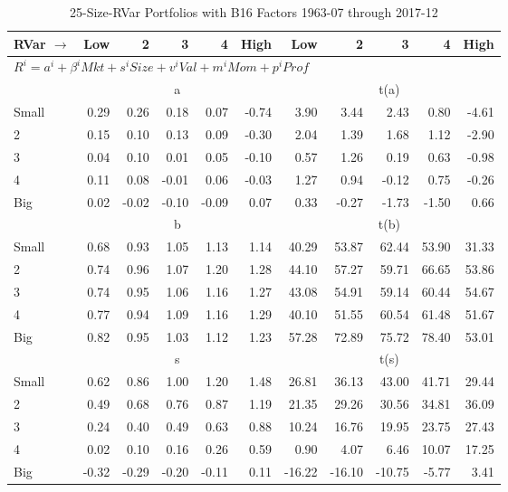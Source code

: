 
\begin{table}[!ht]
\footnotesize
\centering
\caption{25-Size-RVar Portfolios with B16 Factors 1963-07 through 2017-12}
\begin{tabular}{lrrrrrrrrrr}
  \toprule
    
    RVar $\rightarrow$ & Low & 2 & 3 & 4 & High & Low & 2 & 3 & 4 & High  \\ 
  \midrule
  \multicolumn{11}{l}{$R^i=a^i+\beta^iMkt+s^iSize+v^iVal+m^iMom+p^iProf$}  \\
  
     & \multicolumn{5}{c}{a} & \multicolumn{5}{c}{t(a)}   \\
     \cmidrule(r){2-6} \cmidrule(r){7-11} 
    Small  & 0.29  & 0.26  & 0.18  & 0.07  & -0.74  & 3.90  & 3.44  & 2.43  & 0.80  & -4.61   \\
    2  & 0.15  & 0.10  & 0.13  & 0.09  & -0.30  & 2.04  & 1.39  & 1.68  & 1.12  & -2.90   \\
    3  & 0.04  & 0.10  & 0.01  & 0.05  & -0.10  & 0.57  & 1.26  & 0.19  & 0.63  & -0.98   \\
    4  & 0.11  & 0.08  & -0.01  & 0.06  & -0.03  & 1.27  & 0.94  & -0.12  & 0.75  & -0.26   \\
    Big  & 0.02  & -0.02  & -0.10  & -0.09  & 0.07  & 0.33  & -0.27  & -1.73  & -1.50  & 0.66   \\
    
  
     & \multicolumn{5}{c}{b} & \multicolumn{5}{c}{t(b)}   \\
     \cmidrule(r){2-6} \cmidrule(r){7-11} 
    Small  & 0.68  & 0.93  & 1.05  & 1.13  & 1.14  & 40.29  & 53.87  & 62.44  & 53.90  & 31.33   \\
    2  & 0.74  & 0.96  & 1.07  & 1.20  & 1.28  & 44.10  & 57.27  & 59.71  & 66.65  & 53.86   \\
    3  & 0.74  & 0.95  & 1.06  & 1.16  & 1.27  & 43.08  & 54.91  & 59.14  & 60.44  & 54.67   \\
    4  & 0.77  & 0.94  & 1.09  & 1.16  & 1.29  & 40.10  & 51.55  & 60.54  & 61.48  & 51.67   \\
    Big  & 0.82  & 0.95  & 1.03  & 1.12  & 1.23  & 57.28  & 72.89  & 75.72  & 78.40  & 53.01   \\
    
  
     & \multicolumn{5}{c}{s} & \multicolumn{5}{c}{t(s)}   \\
     \cmidrule(r){2-6} \cmidrule(r){7-11} 
    Small  & 0.62  & 0.86  & 1.00  & 1.20  & 1.48  & 26.81  & 36.13  & 43.00  & 41.71  & 29.44   \\
    2  & 0.49  & 0.68  & 0.76  & 0.87  & 1.19  & 21.35  & 29.26  & 30.56  & 34.81  & 36.09   \\
    3  & 0.24  & 0.40  & 0.49  & 0.63  & 0.88  & 10.24  & 16.76  & 19.95  & 23.75  & 27.43   \\
    4  & 0.02  & 0.10  & 0.16  & 0.26  & 0.59  & 0.90  & 4.07  & 6.46  & 10.07  & 17.25   \\
    Big  & -0.32  & -0.29  & -0.20  & -0.11  & 0.11  & -16.22  & -16.10  & -10.75  & -5.77  & 3.41   \\
    

\end{tabular}
\end{table}
